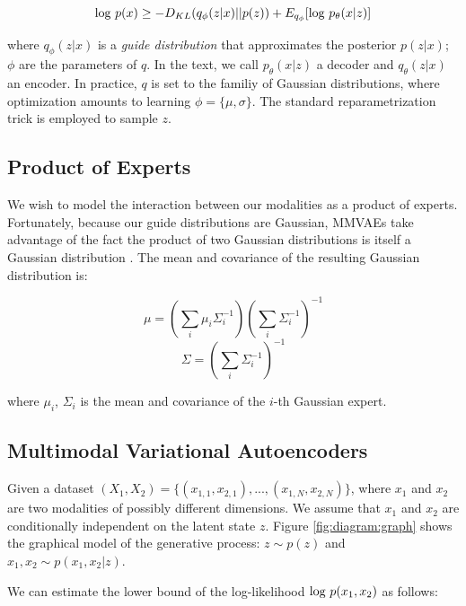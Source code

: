 \documentclass{article}
\begin{document}
\begin{equation}
    \textup{log } p(x) \geq -D_{KL}(q_{\phi}(z | x) || p(z)) + E_{q_{\phi}}[\textup{log } p_{\theta}(x | z)]
\end{equation}

where $q_{\phi}(z | x)$ is a \textit{guide distribution} that approximates the posterior $p(z | x)$; $\phi$ are the parameters of $q$. In the text, we call $p_{\theta}(x | z)$ a decoder and $q_{\theta}(z | x)$ an encoder. In practice, $q$ is set to the familiy of Gaussian distributions, where optimization amounts to learning $\phi=\{\mu, \sigma\}$. The standard reparametrization trick is employed to sample $z$.

\subsection{Product of Experts}

We wish to model the interaction between our modalities as a product of experts. Fortunately, because our guide distributions are Gaussian, MMVAEs take advantage of the fact the product of two Gaussian distributions is itself a Gaussian distribution \cite{cao2014generalized}. The mean and covariance of the resulting Gaussian distribution is:

\begin{equation}
    \mu = (\sum_{i} \mu_{i}\Sigma^{-1}_{i})(\sum_{i}\Sigma^{-1}_{i})^{-1}
\end{equation}
\begin{equation}
    \Sigma = (\sum_{i} \Sigma^{-1}_{i})^{-1}
\end{equation}

where $\mu_{i}$, $\Sigma_{i}$ is the mean and covariance of the $i$-th Gaussian expert.

\subsection{Multimodal Variational Autoencoders}
Given a dataset $(X_{1}, X_{2}) = \{ (x_{1,1}, x_{2,1}), ..., (x_{1,N}, x_{2,N}) \}$, where $x_{1}$ and $x_{2}$ are two modalities of possibly different dimensions. We assume that $x_{1}$ and $x_{2}$ are conditionally independent on the latent state $z$. Figure \ref{fig:diagram:graph} shows the graphical model of the generative process: $z \sim p(z)$ and $x_{1}, x_{2} \sim p(x_{1}, x_{2} | z)$.

We can estimate the lower bound of the log-likelihood $\textup{log }p(x_{1}, x_{2})$ as follows:
\end{document}
